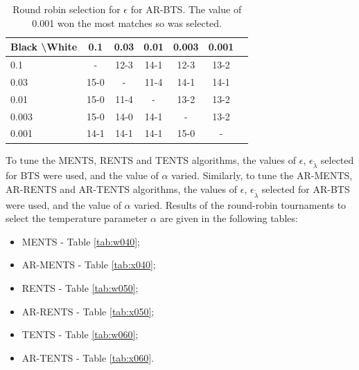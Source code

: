     \begin{table}[tbp]
    \centering
        \begin{tabular}{l|cccccc}
            \textbf{Black \textbackslash White}     & 0.1  & 0.03   & 0.01   & 0.003    & 0.001    \\ 
            \hline
                                    0.1            & - & 12-3 & 14-1 & 12-3 & 13-2   		\\
                                    0.03            & 15-0 & - & 11-4 & 14-1 & 14-1   		\\
                                    0.01          & 15-0 & 11-4 & - & 13-2 & 13-2   		\\
                                    0.003          & 15-0 & 14-0 & 14-1 & - & 13-2   		\\
                                    0.001         & 14-1 & 14-1 & 14-1 & 15-0 &   -   	\\    
        \end{tabular}
        \caption[Round robin  selection for $\epsilon$ for AR-BTS.]{Round robin  selection for $\epsilon$ for AR-BTS. The value of 0.001 won the most matches so was selected. \label{tab:x030}}
    \end{table}
    
    
    
    
    
    
    
    To tune the MENTS, RENTS and TENTS algorithms, the values of $\epsilon$, $\epsilon_{\tilde{\lambda}}$ selected for BTS were used, and the value of $\alpha$ varied. Similarly, to tune the AR-MENTS, AR-RENTS and AR-TENTS algorithms, the values of $\epsilon$, $\epsilon_{\tilde{\lambda}}$ selected for AR-BTS were used, and the value of $\alpha$ varied. Results of the round-robin tournaments to select the temperature parameter $\alpha$ are given in the following tables:
    \begin{itemize}
        \item MENTS - Table \ref{tab:w040};
        \item AR-MENTS - Table \ref{tab:x040};
        \item RENTS - Table \ref{tab:w050};
        \item AR-RENTS - Table \ref{tab:x050};
        \item TENTS - Table \ref{tab:w060};
        \item AR-TENTS - Table \ref{tab:x060}.
    \end{itemize}
    
